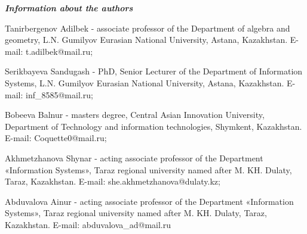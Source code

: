 \emph{\bfseries Information about the authors}

\begin{noparindent}
Tanirbergenov Adilbek - associate professor of the Department of algebra
and geometry, L.N. Gumilyov Eurasian National University, Astana,
Kazakhstan. E-mail: t.adilbek@mail.ru;

Serikbayeva Sandugash - PhD, Senior Lecturer of the Department of
Information Systems, L.N. Gumilyov Eurasian National University, Astana,
Kazakhstan. E-mail: inf\_8585@mail.ru;

Bobeeva Balnur - master\textquotesingle s degree, Central Asian
Innovation University, Department of Technology and information
technologies, Shymkent, Kazakhstan. E-mail: Coquette0@mail.ru;

Akhmetzhanova Shynar - acting associate professor of the Department
«Information Systems», Taraz regional university named after M. KH.
Dulaty, Taraz, Kazakhstan. E-mail: she.akhmetzhanova@dulaty.kz;

Abduvalova Ainur - acting associate professor of the Department
«Information Systems», Taraz regional university named after M. KH.
Dulaty, Taraz, Kazakhstan. E-mail: abduvalova\_ad@mail.ru
\end{noparindent}
